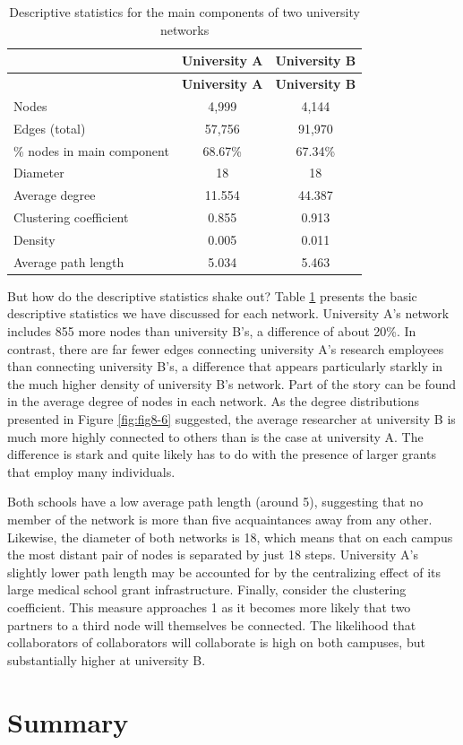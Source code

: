 \documentclass[]{krantz}
\begin{document}
\begin{longtable}[]{@{}lcc@{}}
\caption{\label{tab:table8-1} Descriptive statistics for the main components
of two university networks}\tabularnewline
\toprule
& \textbf{University A} & \textbf{University B}\tabularnewline
\midrule
\endfirsthead
\toprule
& \textbf{University A} & \textbf{University B}\tabularnewline
\midrule
\endhead
Nodes & 4,999 & 4,144\tabularnewline
Edges (total) & 57,756 & 91,970\tabularnewline
\% nodes in main component & 68.67\% & 67.34\%\tabularnewline
Diameter & 18 & 18\tabularnewline
Average degree & 11.554 & 44.387\tabularnewline
Clustering coefficient & 0.855 & 0.913\tabularnewline
Density & 0.005 & 0.011\tabularnewline
Average path length & 5.034 & 5.463\tabularnewline
\bottomrule
\end{longtable}

But how do the descriptive statistics shake out? Table
\ref{tab:table8-1} presents the basic descriptive statistics we have
discussed for each network. University A's network includes 855 more
nodes than university B's, a difference of about 20\%. In contrast,
there are far fewer edges connecting university A's research employees
than connecting university B's, a difference that appears particularly
starkly in the much higher density of university B's network. Part of
the story can be found in the average degree of nodes in each network.
As the degree distributions presented in Figure \ref{fig:fig8-6}
suggested, the average researcher at university B is much more highly
connected to others than is the case at university A. The difference is
stark and quite likely has to do with the presence of larger grants that
employ many individuals.

Both schools have a low average path length (around 5), suggesting that
no member of the network is more than five acquaintances away from any
other. Likewise, the diameter of both networks is 18, which means that
on each campus the most distant pair of nodes is separated by just 18
steps. University A's slightly lower path length may be accounted for by
the centralizing effect of its large medical school grant
infrastructure. Finally, consider the clustering coefficient. This
measure approaches 1 as it becomes more likely that two partners to a
third node will themselves be connected. The likelihood that
collaborators of collaborators will collaborate is high on both
campuses, but substantially higher at university B.

\section{Summary}\label{summary-5}
\end{document}
